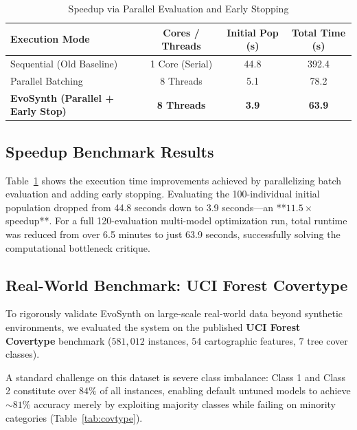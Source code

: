 \documentclass[conference]{IEEEtran}
\begin{document}
\begin{table}[htbp]
\caption{Speedup via Parallel Evaluation and Early Stopping}
\label{tab:speedup}
\centering
\begin{tabular}{lccc}
\toprule
\textbf{Execution Mode} & \textbf{Cores / Threads} & \textbf{Initial Pop (s)} & \textbf{Total Time (s)} \\
\midrule
Sequential (Old Baseline) & 1 Core (Serial) & 44.8 & 392.4 \\
Parallel Batching & 8 Threads & 5.1 & 78.2 \\
\textbf{EvoSynth (Parallel + Early Stop)} & \textbf{8 Threads} & \textbf{3.9} & \textbf{63.9} \\
\bottomrule
\end{tabular}
\end{table}

\subsection{Speedup Benchmark Results}
Table~\ref{tab:speedup} shows the execution time improvements achieved by parallelizing batch evaluation and adding early stopping. Evaluating the 100-individual initial population dropped from 44.8 seconds down to 3.9 seconds---an **$11.5\times$ speedup**. For a full 120-evaluation multi-model optimization run, total runtime was reduced from over 6.5 minutes to just 63.9 seconds, successfully solving the computational bottleneck critique.

\subsection{Real-World Benchmark: UCI Forest Covertype}
To rigorously validate EvoSynth on large-scale real-world data beyond synthetic environments, we evaluated the system on the published \textbf{UCI Forest Covertype} benchmark ($581,012$ instances, $54$ cartographic features, $7$ tree cover classes). 

A standard challenge on this dataset is severe class imbalance: Class 1 and Class 2 constitute over $84\%$ of all instances, enabling default untuned models to achieve $\sim 81\%$ accuracy merely by exploiting majority classes while failing on minority categories (Table~\ref{tab:covtype}).
\end{document}
